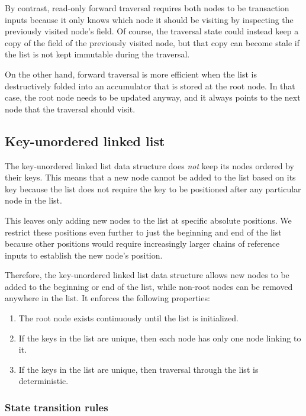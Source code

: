 \documentclass[../midgard.tex]{subfiles}
\begin{document}
By contrast, read-only forward traversal requires both nodes to be transaction inputs because it only knows which node it should be visiting by inspecting the previously visited node's  field. Of course, the traversal state could instead keep a copy of the  field of the previously visited node, but that copy can become stale if the list is not kept immutable during the traversal.

On the other hand, forward traversal is more efficient when the list is destructively folded into an accumulator that is stored at the root node. In that case, the root node needs to be updated anyway, and it always points to the next node that the traversal should visit.

\subsection{Key-unordered linked list}
\label{h:key-unordered-list}

The key-unordered linked list data structure does \emph{not} keep its nodes ordered by their keys. This means that a new node cannot be added to the list based on its key because the list does not require the key to be positioned after any particular node in the list.

This leaves only adding new nodes to the list at specific absolute positions. We restrict these positions even further to just the beginning and end of the list because other positions would require increasingly larger chains of reference inputs to establish the new node's position.

Therefore, the key-unordered linked list data structure allows new nodes to be added to the beginning or end of the list, while non-root nodes can be removed anywhere in the list. It enforces the following properties:
\begin{enumerate}
    \item The root node exists continuously until the list is initialized.
    \item If the keys in the list are unique, then each node has only one node linking to it.
    \item If the keys in the list are unique, then traversal through the list is deterministic.
\end{enumerate}

\subsubsection{State transition rules}
\label{h:key-unordered-list-state-transition-rules}
\end{document}
